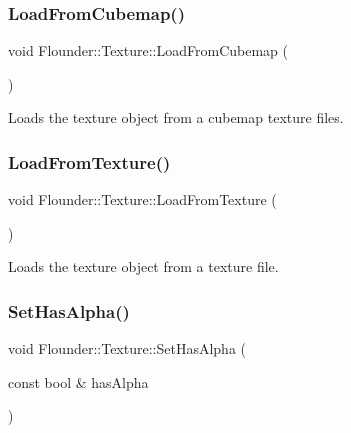 \subsubsection{\texorpdfstring{Load\+From\+Cubemap()}{LoadFromCubemap()}}
{\footnotesize\ttfamily void Flounder\+::\+Texture\+::\+Load\+From\+Cubemap (\begin{DoxyParamCaption}{ }\end{DoxyParamCaption})\hspace{0.3cm}{\ttfamily [private]}}



Loads the texture object from a cubemap texture files. 

\mbox{\label{class_flounder_1_1_texture_a161cd9374983933816a8c5732bddaeb7}} 
\subsubsection{\texorpdfstring{Load\+From\+Texture()}{LoadFromTexture()}}
{\footnotesize\ttfamily void Flounder\+::\+Texture\+::\+Load\+From\+Texture (\begin{DoxyParamCaption}{ }\end{DoxyParamCaption})\hspace{0.3cm}{\ttfamily [private]}}



Loads the texture object from a texture file. 

\mbox{\label{class_flounder_1_1_texture_ad9821b14d55656438883826dd1767e4a}} 
\subsubsection{\texorpdfstring{Set\+Has\+Alpha()}{SetHasAlpha()}}
{\footnotesize\ttfamily void Flounder\+::\+Texture\+::\+Set\+Has\+Alpha (\begin{DoxyParamCaption}\item[{const bool \&}]{has\+Alpha }\end{DoxyParamCaption})\hspace{0.3cm}{\ttfamily [inline]}}




